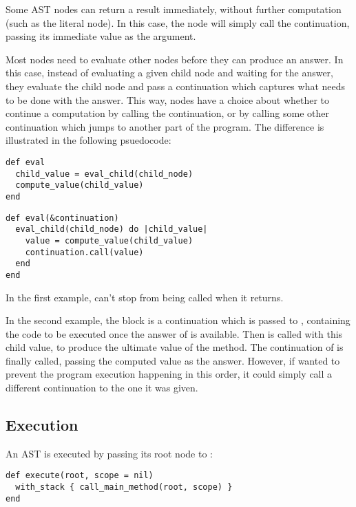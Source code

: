 Some AST nodes can return a result immediately, without further computation (such as the literal  node). In this case, the node will simply call the continuation, passing its immediate value as the argument.

Most nodes need to evaluate other nodes before they can produce an answer. In this case, instead of evaluating a given child node and waiting for the answer, they evaluate the child node and pass a continuation which captures what needs to be done with the answer. This way, nodes have a choice about whether to continue a computation by calling the continuation, or by calling some other continuation which jumps to another part of the program. The difference is illustrated in the following psuedocode:

\begin{lstlisting}[title={\textbf{Without CPS}}]
def eval
  child_value = eval_child(child_node)
  compute_value(child_value)
end
\end{lstlisting}

\begin{lstlisting}[title={\textbf{With CPS}}]
def eval(&continuation)
  eval_child(child_node) do |child_value|
    value = compute_value(child_value)
    continuation.call(value)
  end
end
\end{lstlisting}

In the first example,  can't stop  from being called when it returns.

In the second example, the  block is a continuation which is passed to , containing the code to be executed once the answer of  is available. Then  is called with this child value, to produce the ultimate value of the  method. The continuation of  is finally called, passing the computed value as the answer. However, if  wanted to prevent the program execution happening in this order, it could simply call a different continuation to the one it was given.

\subsection{Execution}

An AST is executed by passing its root node to :

\begin{lstlisting}
def execute(root, scope = nil)
  with_stack { call_main_method(root, scope) }
end
\end{lstlisting}

